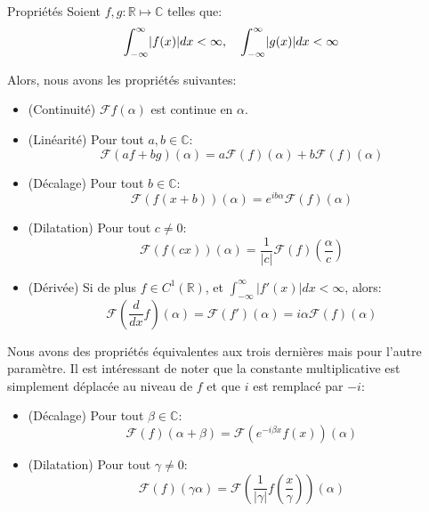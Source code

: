 \documentclass[a4paper]{article}
\begin{document}
\begin{parag}{Propriétés}
    Soient $f, g : \mathbb{R} \mapsto \mathbb{C}$ telles que: 
    \[\int_{-\infty}^{\infty} \left|f\left(x\right)\right|dx < \infty, \mathspace \int_{-\infty}^{\infty} \left|g\left(x\right)\right|dx < \infty\]
    
    Alors, nous avons les propriétés suivantes:
    \begin{itemize}
        \item (Continuité) $\mathcal{F}f\left(\alpha\right)$ est continue en $\alpha$.
        \item (Linéarité) Pour tout $a, b \in \mathbb{C}$:
        \[\mathcal{F}\left(a f + b g\right)\left(\alpha\right) = a \mathcal{F}\left(f\right)\left(\alpha\right) + b \mathcal{F}\left(f\right)\left(\alpha\right)\]
        
        \item (Décalage) Pour tout $b \in \mathbb{C}$:
        \[\mathcal{F} \left(f\left(x + b\right)\right)\left(\alpha\right) = e^{ib \alpha} \mathcal{F}\left(f\right)\left(\alpha\right)\]
        \item (Dilatation) Pour tout $c \neq 0$:
        \[\mathcal{F}\left(f\left(cx\right)\right)\left(\alpha\right) = \frac{1}{\left|c\right|} \mathcal{F}\left(f\right)\left(\frac{\alpha}{c}\right)\]
        
        \item (Dérivée) Si de plus $f \in C^1\left(\mathbb{R}\right)$, et $\int_{-\infty}^{\infty} \left|f'\left(x\right)\right|dx < \infty$, alors:
        \[\mathcal{F}\left(\frac{d}{dx} f\right)\left(\alpha\right) = \mathcal{F}\left(f'\right)\left(\alpha\right) = i \alpha \mathcal{F}\left(f\right)\left(\alpha\right)\]
    \end{itemize}

    Nous avons des propriétés équivalentes aux trois dernières mais pour l'autre paramètre. Il est intéressant de noter que la constante multiplicative est simplement déplacée au niveau de $f$ et que $i$ est remplacé par $-i$:
    \begin{itemize}
        \item (Décalage) Pour tout $\beta \in \mathbb{C}$:
        \[\mathcal{F}\left(f\right)\left(\alpha + \beta\right) = \mathcal{F}\left(e^{-i \beta x} f\left(x\right)\right)\left(\alpha\right)\]

        \item (Dilatation) Pour tout $\gamma \neq 0$:
        \[\mathcal{F}\left(f\right)\left(\gamma \alpha\right) = \mathcal{F}\left(\frac{1}{\left|\gamma\right|} f\left(\frac{x}{\gamma}\right)\right)\left(\alpha\right)\]
        

\end{itemize}
\end{parag}
\end{document}
